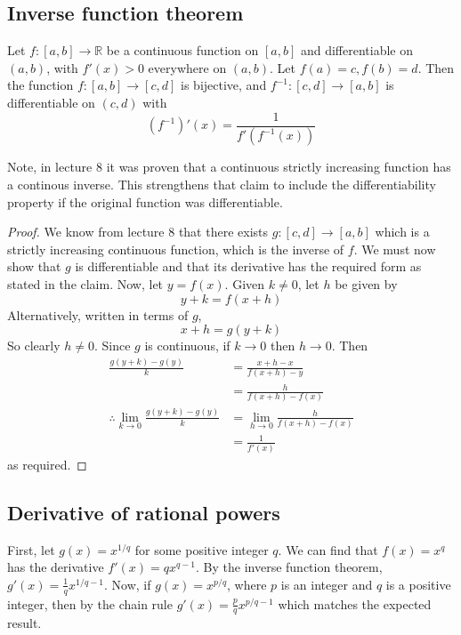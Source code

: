 \subsection{Inverse function theorem}
\begin{theorem}
	Let \(f \colon [a, b] \to \mathbb R\) be a continuous function on \([a, b]\) and differentiable on \((a, b)\), with \(f'(x) > 0\) everywhere on \((a, b)\).
	Let \(f(a) = c, f(b) = d\).
	Then the function \(f \colon [a,b] \to [c,d]\) is bijective, and \(f^{-1} \colon [c,d] \to [a,b]\) is differentiable on \((c, d)\) with
	\[
		\left( f^{-1} \right)' (x) = \frac{1}{f'\left(f^{-1}(x)\right)}
	\]
\end{theorem}
Note, in lecture 8 it was proven that a continuous strictly increasing function has a continous inverse.
This strengthens that claim to include the differentiability property if the original function was differentiable.
\begin{proof}
	We know from lecture 8 that there exists \(g \colon [c,d] \to [a,b]\) which is a strictly increasing continuous function, which is the inverse of \(f\).
	We must now show that \(g\) is differentiable and that its derivative has the required form as stated in the claim.
	Now, let \(y = f(x)\).
	Given \(k \neq 0\), let \(h\) be given by
	\[
		y + k = f(x+h)
	\]
	Alternatively, written in terms of \(g\),
	\[
		x + h = g(y + k)
	\]
	So clearly \(h \neq 0\).
	Since \(g\) is continuous, if \(k \to 0\) then \(h \to 0\).
	Then
	\begin{align*}
		\frac{g(y + k) - g(y)}{k}                           & = \frac{x + h - x}{f(x+h) - y}           \\
		                                                    & = \frac{h}{f(x+h) - f(x)}                \\
		\therefore \lim_{k \to 0} \frac{g(y + k) - g(y)}{k} & = \lim_{h \to 0} \frac{h}{f(x+h) - f(x)} \\
		                                                    & = \frac{1}{f'(x)}
	\end{align*}
	as required.
\end{proof}

\subsection{Derivative of rational powers}
First, let \(g(x) = x^{1/q}\) for some positive integer \(q\).
We can find that \(f(x) = x^q\) has the derivative \(f'(x) = qx^{q-1}\).
By the inverse function theorem, \(g'(x) = \frac{1}{q}x^{1/q - 1}\).
Now, if \(g(x) = x^{p/q}\), where \(p\) is an integer and \(q\) is a positive integer, then by the chain rule \(g'(x) = \frac{p}{q}x^{p/q - 1}\) which matches the expected result.


